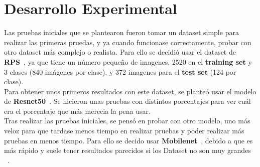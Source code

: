 \chapter{Desarrollo Experimental}\label{ch:desarrollo_experimental}

Las pruebas iniciales que se plantearon fueron tomar un dataset simple para realizar las primeras pruedas, y ya cuando
funcionase correctamente, probar con otro dataset más complejo o realista.
Para ello se decidió usar el dataset de \textbf{RPS}~\cite{}, ya que tiene un número pequeño de imagenes, 2520 en el
\textbf{training set} y 3 clases (840 imágenes por clase), y 372 imagenes para el \textbf{test set} (124 por clase).
\\[6pt]

Para obtener unos primeros resultados con este dataset, se planteó usar el modelo de \textbf{Resnet50}~\cite{}.
Se hicieron unas pruebas con distintos porcentajes para ver cuál era el porcentaje que más merecia la pena usar.
\\[6pt]

Tras realizar las pruebas iniciales, se pensó en probar con otro modelo, uno más veloz para que tardase menos tiempo en
realizar pruebas y poder realizar más pruebas en menos tiempo.
Para ello se decido usar \textbf{Mobilenet}~\cite{}, debido a que es más rápido y suele tener resultados parecidos si
los Dataset no son muy grandes ~\cite{ResnetVsMobilenet}.
